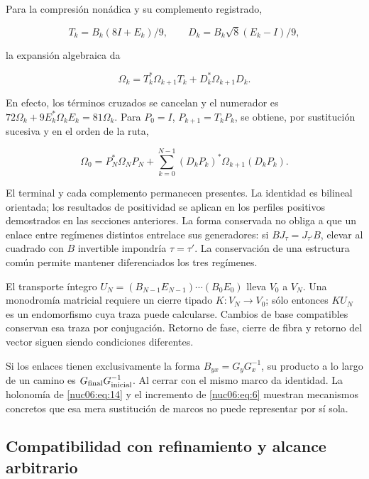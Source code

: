 Para la compresión nonádica y su complemento registrado,

\[
T_k=B_k(8I+E_k)/9,\qquad
D_k=B_k\sqrt8(E_k-I)/9,
\]

la expansión algebraica da

\begin{equation}
\Omega_k=T_k^*\Omega_{k+1}T_k+D_k^*\Omega_{k+1}D_k.
\label{nuc06:eq:17}
\end{equation}

En efecto, los términos cruzados se cancelan y el numerador es \(72\Omega_k+9E_k^*\Omega_kE_k=81\Omega_k\). Para \(P_0=I\), \(P_{k+1}=T_kP_k\), se obtiene, por sustitución sucesiva y en el orden de la ruta,

\begin{equation}
\boxed{\quad
\Omega_0=P_N^*\Omega_NP_N+
\sum_{k=0}^{N-1}(D_kP_k)^*\Omega_{k+1}(D_kP_k).
\quad}
\label{nuc06:eq:18}
\end{equation}

El terminal y cada complemento permanecen presentes. La identidad es bilineal orientada; los resultados de positividad se aplican en los perfiles positivos demostrados en las secciones anteriores. La forma conservada no obliga a que un enlace entre regímenes distintos entrelace sus generadores: si \(BJ_\tau=J_{\tau'}B\), elevar al cuadrado con \(B\) invertible impondría \(\tau=\tau'\). La conservación de una estructura común permite mantener diferenciados los tres regímenes.

El transporte íntegro \(U_N=(B_{N-1}E_{N-1})\cdots(B_0E_0)\) lleva \(V_0\) a \(V_N\). Una monodromía matricial requiere un cierre tipado \(K:V_N\to V_0\); sólo entonces \(KU_N\) es un endomorfismo cuya traza puede calcularse. Cambios de base compatibles conservan esa traza por conjugación. Retorno de fase, cierre de fibra y retorno del vector siguen siendo condiciones diferentes.

Si los enlaces tienen exclusivamente la forma \(B_{yx}=G_yG_x^{-1}\), su producto a lo largo de un camino es \(G_{\rm final}G_{\rm inicial}^{-1}\). Al cerrar con el mismo marco da identidad. La holonomía de \eqref{nuc06:eq:14} y el incremento de \eqref{nuc06:eq:6} muestran mecanismos concretos que esa mera sustitución de marcos no puede representar por sí sola.

\subsection{Compatibilidad con refinamiento y alcance arbitrario}

